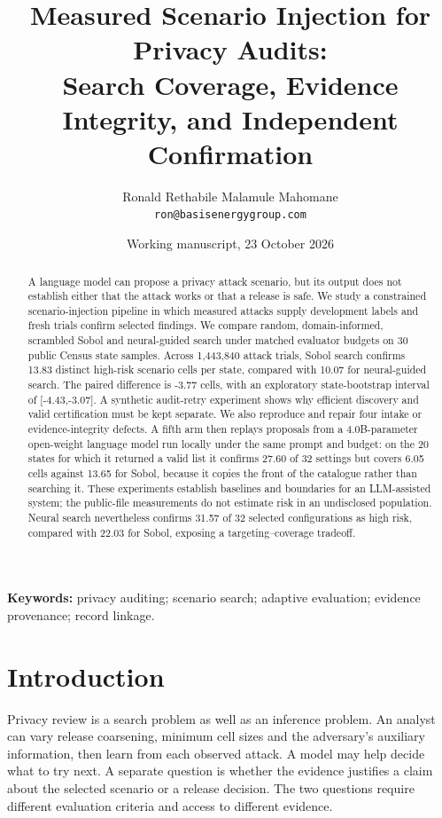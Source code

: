\documentclass[11pt]{article}
\title{Measured Scenario Injection for Privacy Audits:\\Search Coverage, Evidence Integrity, and Independent Confirmation}
\author{Ronald Rethabile Malamule Mahomane\\\small\texttt{ron@basisenergygroup.com}}
\date{Working manuscript, 23 October 2026}
\begin{document}
\maketitle
\begin{abstract}
A language model can propose a privacy attack scenario, but its output does not establish either that the attack works or that a release is safe. We study a constrained scenario-injection pipeline in which measured attacks supply development labels and fresh trials confirm selected findings. We compare random, domain-informed, scrambled Sobol and neural-guided search under matched evaluator budgets on 30 public Census state samples. Across 1,443,840 attack trials, Sobol search confirms 13.83 distinct high-risk scenario cells per state, compared with 10.07 for neural-guided search. The paired difference is -3.77 cells, with an exploratory state-bootstrap interval of [-4.43,-3.07]. A synthetic audit-retry experiment shows why efficient discovery and valid certification must be kept separate. We also reproduce and repair four intake or evidence-integrity defects. A fifth arm then replays proposals from a 4.0B-parameter open-weight language model run locally under the same prompt and budget: on the 20 states for which it returned a valid list it confirms 27.60 of 32 settings but covers 6.05 cells against 13.65 for Sobol, because it copies the front of the catalogue rather than searching it. These experiments establish baselines and boundaries for an LLM-assisted system; the public-file measurements do not estimate risk in an undisclosed population.
Neural search nevertheless confirms 31.57 of 32 selected configurations as high risk, compared with 22.03 for Sobol, exposing a targeting--coverage tradeoff.
\end{abstract}
\noindent\textbf{Keywords:} privacy auditing; scenario search; adaptive evaluation; evidence provenance; record linkage.

\section{Introduction}
Privacy review is a search problem as well as an inference problem. An analyst can vary release coarsening, minimum cell sizes and the adversary's auxiliary information, then learn from each observed attack. A model may help decide what to try next. A separate question is whether the evidence justifies a claim about the selected scenario or a release decision. The two questions require different evaluation criteria and access to different evidence.
\end{document}
